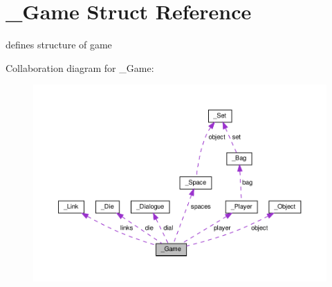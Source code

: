 \hypertarget{struct__Game}{}\section{\+\_\+\+Game Struct Reference}
\label{struct__Game}


defines structure of game  




Collaboration diagram for \+\_\+\+Game\+:
\nopagebreak
\begin{figure}[H]
\begin{center}
\leavevmode
\includegraphics[width=350pt]{struct__Game__coll__graph}
\end{center}
\end{figure}
